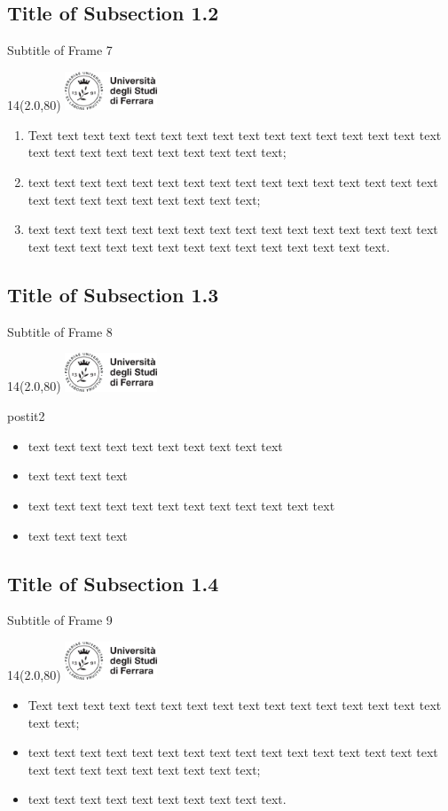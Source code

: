 \documentclass[11pt,xcolor={dvipsnames}]{beamer} %
\newcommand{\MyLogo}{%
\begin{textblock}{14}(2.0,80)
 \includegraphics[height=1.15cm, angle=0]{logo}
\end{textblock}
}
\begin{document}
\subsection{Title of Subsection 1.2}
\begin{frame}{Subtitle of Frame 7}
\MyLogo
\begin{enumerate}
\item<1-> Text text text text text text text text text text text text text text text text text text text text text text text text text text;
\item<2-> text text text text text text text text text text text text text text text text text text text text text text text text text;
\item<3-> text text text text text text text text text text text text text text text text text text text text text text text text text text text text text text.
\end{enumerate}
\end{frame}

\subsection{Title of Subsection 1.3}
\begin{frame}{Subtitle of Frame 8}
\MyLogo
\begin{center}
\end{center}
\pause
\begin{beamercolorbox}[shadow=false, rounded=true]{postit2}
\begin{itemize}
\item text text text text text text text text text text
\item text text text text
\item text text text text text text text text text text text text
\item text text text text
\end{itemize}
\end{beamercolorbox}
\end{frame}

\subsection{Title of Subsection 1.4}
\begin{frame}{Subtitle of Frame 9}
\transdissolve
\MyLogo
\begin{itemize}
\item<1-> Text text text text text text text text text text text text text text text text text text;
\item<2-> text text text text text text text text text text text text text text text text text text text text text text text text text;
\item<3-> text text text text text text text text text text.
\end{itemize}
\end{frame}
\end{document}
